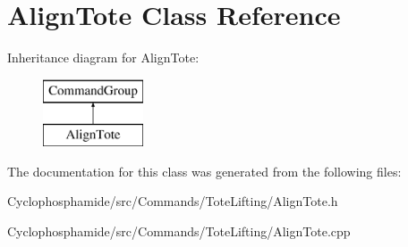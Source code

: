 \hypertarget{class_align_tote}{}\section{Align\+Tote Class Reference}
\label{class_align_tote}
Inheritance diagram for Align\+Tote\+:\begin{figure}[H]
\begin{center}
\leavevmode
\includegraphics[height=2.000000cm]{class_align_tote}
\end{center}
\end{figure}


The documentation for this class was generated from the following files\+:\begin{DoxyCompactItemize}
\item 
Cyclophosphamide/src/\+Commands/\+Tote\+Lifting/Align\+Tote.\+h\item 
Cyclophosphamide/src/\+Commands/\+Tote\+Lifting/Align\+Tote.\+cpp\end{DoxyCompactItemize}
